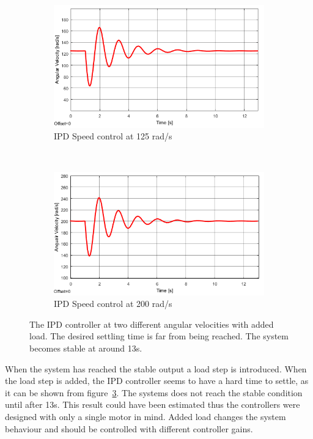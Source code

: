 \begin{figure}[h!]
	\centering
	\begin{subfigure}[b]{0.45\textwidth}
		\includegraphics[width=\textwidth]{graphics/IPD_load125}
		\caption{IPD Speed control at 125 rad/s}
		\label{fig:ipdload125}
	\end{subfigure}
	~ %
	\begin{subfigure}[b]{0.45\textwidth}
		\includegraphics[width=\textwidth]{graphics/IPD_load200}
		\caption{IPD Speed control at 200 rad/s}
		\label{fig:ipdload200}
	\end{subfigure}
	\caption{The IPD controller at two different angular velocities with added load. The desired settling time is far from being reached. The system becomes stable at around 13s.}
	\label{fig:ipdload}
\end{figure}

When the system has reached the stable output a load step is introduced.
When the load step is added, the IPD controller seems to have a hard time to settle, as it can be shown from figure~\ref{fig:ipdload}. The systems does not reach the stable condition until after 13s. This result could have been estimated thus the controllers were designed with only a single motor in mind. Added load changes the system behaviour and should be controlled with different controller gains.
